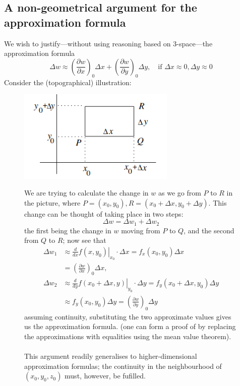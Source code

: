 \documentclass{report}
\begin{document}
\subsection{A non-geometrical argument for the approximation formula} %
We wish to justify---without using reasoning based on 3-space---the approximation formula
\begin{equation*}
\Delta w\approx\left(\frac{\partial w}{\partial x}\right)_0\Delta x+
\left(\frac{\partial w}{\partial y}\right)_0\Delta y,
\quad\text{if }\Delta x\approx0,\Delta y\approx0
\end{equation*}
Consider the (topographical) illustration:
\begin{figure}[h]
\begin{center}
\includegraphics[width=7.5cm]{98}\\
\end{center}
We are trying to calculate the change in $w$ as we go from $P$ to $R$ in the picture, where 
$P=(x_0,y_0),R=(x_0+\Delta x,y_0+\Delta y)$. This change can be thought of taking place in two steps:
\begin{equation*}
\Delta w=\Delta w_1+\Delta w_2
\end{equation*}
the first being the change in $w$ moving from $P$ to $Q$, and the second from $Q$ to $R$; now see that
\begin{align*}
\Delta w_1&\approx\left.\frac{d}{dx}f(x,y_0)\right|_{x_0}\cdot\Delta x
=f_x(x_0,y_0)\Delta x\\
&=\left(\frac{\partial w}{\partial x}\right)_0\Delta x,\\
\Delta w_2&\approx\left.\frac{d}{dy}f(x_0+\Delta x,y)\right|_{y_0}\cdot\Delta y
=f_y(x_0+\Delta x,y_0)\Delta y\\
&\approx f_y(x_0,y_0)\Delta y
=\left(\frac{\partial w}{\partial y}\right)_0\Delta y
\end{align*}
assuming continuity, substituting the two approximate values gives us the approximation formula. (one can form a
proof of by replacing the approximations with equalities using the mean value theorem).\\
\vspace{1mm}\\
This argument readily generalises to higher-dimensional approximation formulas; the continuity in the neighbourhood
of $(x_0,y_0,z_0)$ must, however, be fufilled.
\end{figure}
\newpage
\end{document}

